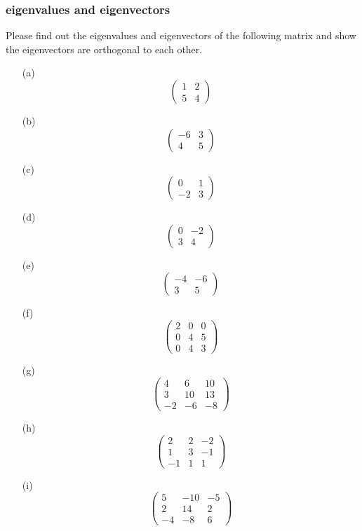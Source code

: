 \documentclass{article}
\newcommand{\pmtwo}[4]{
    \begin{pmatrix}
        #1&#2\\
        #3&#4
    \end{pmatrix}
    }
\newcommand{\pmthree}[9]{
    \begin{pmatrix}
        #1&#2&#3\\
        #4&#5&#6\\
        #7&#8&#9
    \end{pmatrix}
}
\begin{document}
\subsubsection{eigenvalues and eigenvectors}
Please find out the eigenvalues and eigenvectors of the following matrix and show the eigenvectors are orthogonal to each other.
\begin{enumerate}
    \item[(a)] \[\pmtwo{1}{2}{5}{4}\]
    \item[(b)] \[\pmtwo{-6}{3}{4}{5}\]
    \item[(c)] \[\pmtwo{0}{1}{-2}{3}\]
    \item[(d)] \[\pmtwo{0}{-2}{3}{4}\]
    \item[(e)] \[\pmtwo{-4}{-6}{3}{5}\]
    \item[(f)] \[\pmthree{2}{0}{0}{0}{4}{5}{0}{4}{3}\]
    \item[(g)] \[\pmthree{4}{6}{10}{3}{10}{13}{-2}{-6}{-8}\]
    \item[(h)] \[\pmthree{2}{2}{-2}{1}{3}{-1}{-1}{1}{1}\]
    \item[(i)] \[\pmthree{5}{-10}{-5}{2}{14}{2}{-4}{-8}{6}\]
\end{enumerate}
\end{document}
